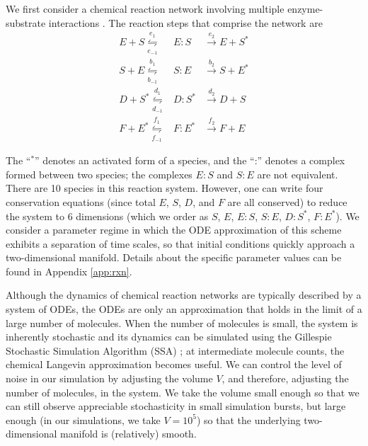 \documentclass[aip,jcp,preprint]{revtex4-1}
\begin{document}
We first consider a chemical reaction network involving  multiple enzyme-substrate interactions \cite{zagaris2012stability}.
%
The reaction steps that comprise the network are\\
\begin{equation}
\begin{array}{rcl}
E + S \overset{e_1}{\underset{e_{-1}}{\leftrightharpoons}} & E:S & \overset{e_2}{\rightarrow} E + S^{*} \\
S + E \overset{b_1}{\underset{b_{-1}}{\leftrightharpoons}} & S:E & \overset{b_2}{\rightarrow} S + E^{*}\\
D + S^{*} \overset{d_1}{\underset{d_{-1}}{\leftrightharpoons}} & D:S^{*} & \overset{d_2}{\rightarrow} D + S\\
F + E^{*} \overset{f_1}{\underset{f_{-1}}{\leftrightharpoons}} & F:E^{*} & \overset{f_2}{\rightarrow} F + E
\end{array}
\end{equation}

The ``$^{*}$'' denotes an activated form of a species, and the ``:'' denotes a complex formed between two species; the complexes $E:S$ and $S:E$ are not equivalent.
%
There are 10 species in this reaction system.
%
However, one can write four conservation equations (since total $E$, $S$, $D$, and $F$ are all conserved) to reduce the system to 6 dimensions
(which we order as $S$, $E$, $E:S$, $S:E$, $D:S^{*}$, $F:E^{*}$).
%
We consider a parameter regime in which the ODE approximation of this scheme exhibits a separation of time scales, so that initial conditions quickly approach a two-dimensional manifold.
%
Details about the specific parameter values can be found in Appendix \ref{app:rxn}.

Although the dynamics of chemical reaction networks are typically described by a system of ODEs, the ODEs are only an approximation that holds
in the limit of a large number of molecules.
%
When the number of molecules is small, the system is inherently stochastic and its dynamics can be simulated using the
Gillespie Stochastic Simulation Algorithm (SSA) \cite{gillespie1977exact}; at intermediate molecule counts, the chemical Langevin approximation \cite{gillespie2000chemical}
becomes useful.
%
We can control the level of noise in our simulation by adjusting the volume $V$, and therefore, adjusting the number of molecules, in the system.
%
We take the volume small enough so that we can still observe appreciable stochasticity in small simulation bursts, but large enough (in our simulations, we take $V=10^5$) so that the underlying two-dimensional manifold is (relatively) smooth.
\end{document}
